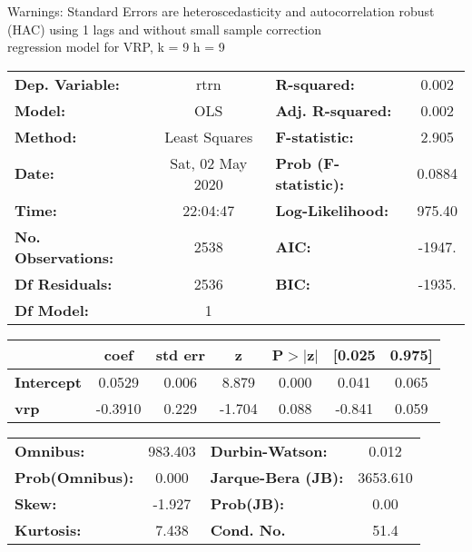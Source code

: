 Warnings: \newline
 [1] Standard Errors are heteroscedasticity and autocorrelation robust (HAC) using 1 lags and without small sample correction\\ 

regression model for VRP, k = 9 h = 9\begin{center}
\begin{tabular}{lclc}
\toprule
\textbf{Dep. Variable:}    &       rtrn       & \textbf{  R-squared:         } &     0.002   \\
\textbf{Model:}            &       OLS        & \textbf{  Adj. R-squared:    } &     0.002   \\
\textbf{Method:}           &  Least Squares   & \textbf{  F-statistic:       } &     2.905   \\
\textbf{Date:}             & Sat, 02 May 2020 & \textbf{  Prob (F-statistic):} &   0.0884    \\
\textbf{Time:}             &     22:04:47     & \textbf{  Log-Likelihood:    } &    975.40   \\
\textbf{No. Observations:} &        2538      & \textbf{  AIC:               } &    -1947.   \\
\textbf{Df Residuals:}     &        2536      & \textbf{  BIC:               } &    -1935.   \\
\textbf{Df Model:}         &           1      & \textbf{                     } &             \\
\bottomrule
\end{tabular}
\begin{tabular}{lcccccc}
                   & \textbf{coef} & \textbf{std err} & \textbf{z} & \textbf{P$> |$z$|$} & \textbf{[0.025} & \textbf{0.975]}  \\
\midrule
\textbf{Intercept} &       0.0529  &        0.006     &     8.879  &         0.000        &        0.041    &        0.065     \\
\textbf{vrp}       &      -0.3910  &        0.229     &    -1.704  &         0.088        &       -0.841    &        0.059     \\
\bottomrule
\end{tabular}
\begin{tabular}{lclc}
\textbf{Omnibus:}       & 983.403 & \textbf{  Durbin-Watson:     } &    0.012  \\
\textbf{Prob(Omnibus):} &   0.000 & \textbf{  Jarque-Bera (JB):  } & 3653.610  \\
\textbf{Skew:}          &  -1.927 & \textbf{  Prob(JB):          } &     0.00  \\
\textbf{Kurtosis:}      &   7.438 & \textbf{  Cond. No.          } &     51.4  \\
\bottomrule
\end{tabular}
\end{center}

